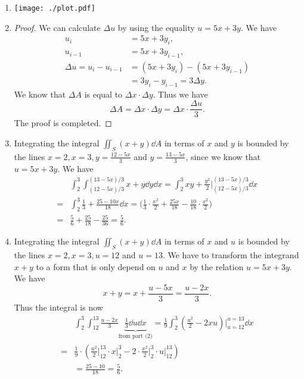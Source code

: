 \documentclass[8pt,twocolumn]{article}
\begin{document}
\begin{Answer}[number=14]
  \begin{enumerate}
    \item \texttt{[image: ./plot.pdf]}
    \item \begin{proof}
        We can calculate $\Delta u$ by using the equality $u=5x+3y$. We have
        \begin{align*}
          u_i &= 5x+3y_i,\\
          u_{i-1} &= 5x+3y_{i-1},\\
          \Delta u = u_i - u_{i-1} &= (5x+3y_i) - (5x+3y_{i-1}) \\
          &= 3y_i - y_{i-1} = 3\Delta y.
        \end{align*}
        We know that $\Delta A$ is equal to $\Delta x\cdot\Delta y$. Thus we
        have
        \[
          \Delta A = \Delta x\cdot \Delta y = \Delta x\cdot\frac{\Delta u}{3}.
        \]
        The proof is completed.
  \end{proof}
  \item Integrating the integral $\iint_S (x+y) \dd{A}$ in terms of $x$ and $y$
    is bounded by the lines $x=2, x=3, y=\frac{12-5x}{3}$ and
      $y=\frac{13-5x}{3}$, since we know that $u=5x+3y$. We have
      \begin{align*}
        &\int_2^3\int_{(12-5x)/3}^{(13-5x)/3} x+y \dd{y}\dd{x} =
        \int_2^3 xy+\frac{y^2}{2}\Big\vert_{(12-5x)/3}^{(13-5x)/3}\dd{x} \\
        =& \int_2^3 \frac{1}{3} + \frac{25-10x}{18}\dd{x} = \big( \frac{1}{3}
        \cdot \frac{x^2}{2} + \frac{25x}{18} - \frac{10}{18}\cdot\frac{x^2}{2}
        \big) \\
        =& \frac{5}{6} + \frac{25}{18} - \frac{25}{36} = \frac{5}{6}.
      \end{align*}
    \item Integrating the integral $\iint_S (x+y) \dd{A}$ in terms of $x$ and
      $u$ is bounded by the lines $x=2, x=3, u=12$ and $u=13$. We have to
      transform the integrand $x+y$ to a form that is only depend on $u$ and
      $x$ by the relation $u=5x+3y$. We have
      \[
        x+y = x + \frac{u-5x}{3} = \frac{u-2x}{3}.
      \]
      Thus the integral is now
      \begin{align*}
        &\int_2^3\int_{12}^{13}\frac{u-2x}{3}
        \underbrace{\frac{1}{3}\dd{u}\dd{x}}_\text{from part (2)} =
        \frac{1}{9}\int_2^3(\frac{u^2}{2}-2xu)\Big\vert_{u=12}^{u=13}\dd{x} \\
        =& \frac{1}{9} \cdot (\frac{u^2}{2}\vert_{12}^{13}\cdot x\vert_2^3 -
        2\cdot \frac{x^2}{2}\vert_2^3\cdot u\vert_{12}^{13}) \\
        &= \frac{25-10}{18} = \frac{5}{6}.
      \end{align*}
  \end{enumerate}
\end{Answer}
\end{document}
